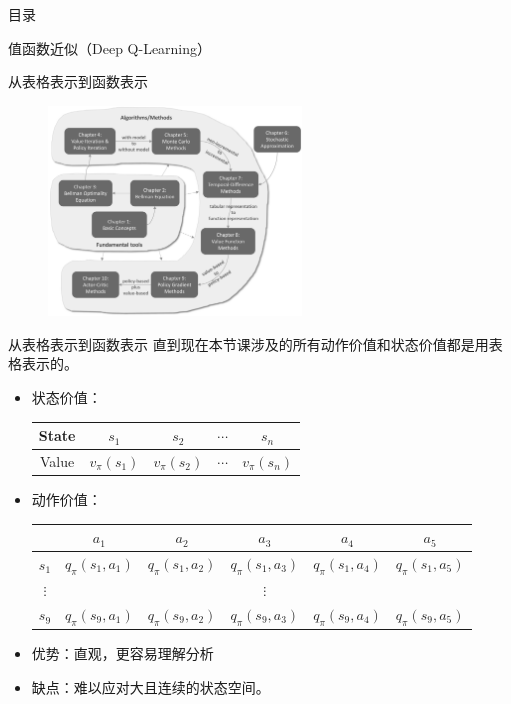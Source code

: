 \begin{frame}{目录}
    \tableofcontents
\end{frame}

\begin{section}{值函数近似\alert{（Deep Q-Learning）}}

\begin{frame}{从表格表示到函数表示}
    \begin{figure}
        \centering
        \includegraphics[width=0.6\textwidth]{assets/Figure_chapterMap.png}
    \end{figure}
\end{frame}

\begin{frame}{从表格表示到函数表示}
    直到现在本节课涉及的所有动作价值和状态价值都是用\alert{表格}表示的。
    \begin{itemize}
        \item 状态价值：
        \begin{table}[]
            \begin{tabular}{@{}ccccc@{}}
            \toprule
            State & $s_1$& $s_2$& $\cdots$& $s_n$\\ \midrule
            Value & $v_\pi(s_1)$& $v_\pi(s_2)$& $\cdots$& $v_\pi(s_n)$\\
            \bottomrule
            \end{tabular}
        \end{table}
        \item 动作价值：
        \begin{table}[]
            \begin{tabular}{@{}cccccc@{}}
            \toprule
             & $a_1$& $a_2$& $a_3$& $a_4$& $a_5$\\ \midrule
            $s_1$ & $q_\pi(s_1,a_1)$& $q_\pi(s_1,a_2)$& $q_\pi(s_1,a_3)$& $q_\pi(s_1,a_4)$& $q_\pi(s_1,a_5)$\\
            $\vdots$ &&&$\vdots$&&  \\
            $s_9$  & $q_\pi(s_9,a_1)$& $q_\pi(s_9,a_2)$& $q_\pi(s_9,a_3)$& $q_\pi(s_9,a_4)$& $q_\pi(s_9,a_5)$\\
            \bottomrule
            \end{tabular}
        \end{table}
        \item \alert{优势}：直观，更容易理解分析
        \item \alert{缺点}：难以应对大且\alert{连续}的状态空间。
        

\end{itemize}
\end{frame}
\end{section}
